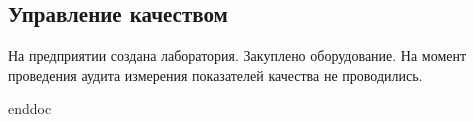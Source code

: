 \subsection{Управление качеством}
\label{bp:quality}

На предприятии создана лаборатория.  Закуплено оборудование. На момент проведения аудита измерения показателей качества не проводились.



\clearpage
 {enddoc}